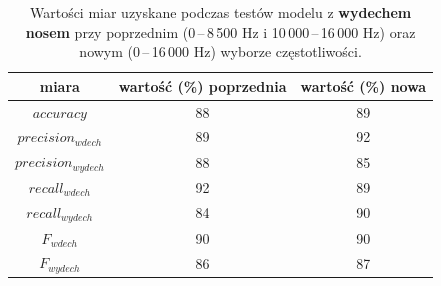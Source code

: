 \documentclass[polish]{article}
\begin{document}
\begin{table}[H]
\caption{Wartości miar uzyskane podczas testów modelu z \textbf{wydechem nosem} przy poprzednim (0\,--\,8\,500 \unit{Hz} i 10\,000\,--\,16\,000 \unit{Hz}) oraz nowym (0\,--\,16\,000 \unit{Hz}) wyborze częstotliwości.}
\begin{center}
\begin{tabular}{c | c | c}
	miara & wartość (\%) poprzednia & wartość (\%) nowa \\
	\hline
	$accuracy$ & 88 & 89 \\
	$precision_{wdech}$ & 89 & 92 \\
	$precision_{wydech}$ & 88 & 85 \\
	$recall_{wdech}$ & 92 & 89 \\
	$recall_{wydech}$ & 84 & 90 \\
	$F_{wdech}$ & 90 & 90 \\
	$F_{wydech}$ & 86 & 87
\end{tabular}
\end{center}
\end{table}
\end{document}
